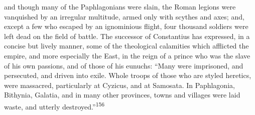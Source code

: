 and though many of the Paphlagonians were slain, the Roman
legions were vanquished by an irregular multitude, armed only
with scythes and axes; and, except a few who escaped by an
ignominious flight, four thousand soldiers were left dead on the
field of battle. The successor of Constantius has expressed, in a
concise but lively manner, some of the theological calamities
which afflicted the empire, and more especially the East, in the
reign of a prince who was the slave of his own passions, and of
those of his eunuchs: “Many were imprisoned, and persecuted, and
driven into exile. Whole troops of those who are styled heretics,
were massacred, particularly at Cyzicus, and at Samosata. In
Paphlagonia, Bithynia, Galatia, and in many other provinces,
towns and villages were laid waste, and utterly destroyed.”\textsuperscript{156}




